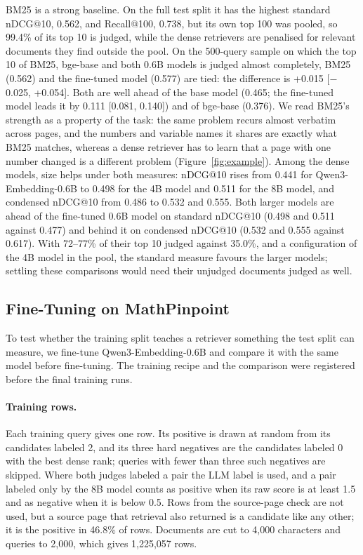 BM25 is a strong baseline. On the full test split it has the highest standard nDCG@10, 0.562, and Recall@100, 0.738, but its own top 100 was pooled, so 99.4\% of its top 10 is judged, while the dense retrievers are penalised for relevant documents they find outside the pool. On the 500-query sample on which the top 10 of BM25, bge-base and both 0.6B models is judged almost completely, BM25 (0.562) and the fine-tuned model (0.577) are tied: the difference is +0.015 [$-$0.025, +0.054]. Both are well ahead of the base model (0.465; the fine-tuned model leads it by 0.111 [0.081, 0.140]) and of bge-base (0.376). We read BM25's strength as a property of the task: the same problem recurs almost verbatim across pages, and the numbers and variable names it shares are exactly what BM25 matches, whereas a dense retriever has to learn that a page with one number changed is a different problem (Figure~\ref{fig:example}). Among the dense models, size helps under both measures: nDCG@10 rises from 0.441 for Qwen3-Embedding-0.6B to 0.498 for the 4B model and 0.511 for the 8B model, and condensed nDCG@10 from 0.486 to 0.532 and 0.555. Both larger models are ahead of the fine-tuned 0.6B model on standard nDCG@10 (0.498 and 0.511 against 0.477) and behind it on condensed nDCG@10 (0.532 and 0.555 against 0.617). With 72--77\% of their top 10 judged against 35.0\%, and a configuration of the 4B model in the pool, the standard measure favours the larger models; settling these comparisons would need their unjudged documents judged as well.

\subsection{Fine-Tuning on MathPinpoint}
\label{sec:finetune}

To test whether the training split teaches a retriever something the test split can measure, we fine-tune Qwen3-Embedding-0.6B and compare it with the same model before fine-tuning. The training recipe and the comparison were registered before the final training runs.

\paragraph{Training rows.}
Each training query gives one row. Its positive is drawn at random from its candidates labeled 2, and its three hard negatives are the candidates labeled 0 with the best dense rank; queries with fewer than three such negatives are skipped. Where both judges labeled a pair the LLM label is used, and a pair labeled only by the 8B model counts as positive when its raw score is at least 1.5 and as negative when it is below 0.5. Rows from the source-page check are not used, but a source page that retrieval also returned is a candidate like any other; it is the positive in 46.8\% of rows. Documents are cut to 4,000 characters and queries to 2,000, which gives 1,225,057 rows.

